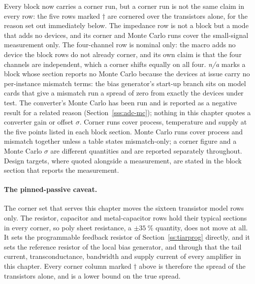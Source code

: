 \noindent Every block now carries a corner run, but a corner run is not the same
claim in every row: the five rows marked \(\dagger\) are cornered over the
transistors alone, for the reason set out immediately below. The impedance row is
not a block but a mode that adds no devices, and its corner and Monte Carlo runs
cover the small-signal measurement only.
The four-channel row is nominal only:
the macro adds no device the block rows do not already corner, and its own claim
is that the four channels are independent, which a corner shifts equally on all
four.
\emph{n/a} marks a block whose
section reports no Monte Carlo because the devices at issue carry no
per-instance mismatch terms: the bias generator's start-up branch sits on model
cards that give a mismatch
run a spread of zero from exactly the devices under test. The converter's Monte
Carlo has been run and is reported as a negative result for a related reason
(Section~\ref{sss:adc-mc}); nothing in this chapter quotes a converter gain or
offset \(\sigma\).
Corner runs cover process, temperature and supply at the five points listed in
each block section. Monte Carlo runs cover process and mismatch together unless a
table states mismatch-only; a corner figure
and a Monte Carlo \(\sigma\) are different quantities and are reported separately
throughout. Design
targets, where quoted alongside a measurement, are stated in the block section that
reports the measurement.


\paragraph{The pinned-passive caveat.}\label{p:pinned-passives}
The corner set that serves this chapter moves the sixteen transistor model rows
only. The resistor, capacitor and metal-capacitor rows hold their typical
sections in every corner, so poly sheet resistance, a
\(\pm\SI{35}{\percent}\) quantity, does not move at all. It sets the
programmable feedback resistor of Section~\ref{ss:tiarprog} directly, and it
sets the reference resistor of the local bias generator, and through that the
tail current, transconductance, bandwidth and supply current of every amplifier
in this chapter. Every corner column marked \(\dagger\) above is therefore the
spread of the transistors alone, and is a lower bound on the true spread.

